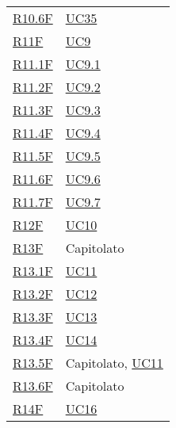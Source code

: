 \begin{center}
\begin{longtable}[!h]{p{50px} p{50px}}
        \hyperref[tab:RequisitiFunzionali]{R10.6F} & \hyperref[sec:UC35]{UC35}                      \\
        \hyperref[tab:RequisitiFunzionali]{R11F}   & \hyperref[sec:UC9]{UC9}                        \\
        \hyperref[tab:RequisitiFunzionali]{R11.1F} & \hyperref[sec:UC9.1]{UC9.1}                    \\
        \hyperref[tab:RequisitiFunzionali]{R11.2F} & \hyperref[sec:UC9.2]{UC9.2}                    \\
        \hyperref[tab:RequisitiFunzionali]{R11.3F} & \hyperref[sec:UC9.3]{UC9.3}                    \\
        \hyperref[tab:RequisitiFunzionali]{R11.4F} & \hyperref[sec:UC9.4]{UC9.4}                    \\
        \hyperref[tab:RequisitiFunzionali]{R11.5F} & \hyperref[sec:UC9.5]{UC9.5}                    \\
        \hyperref[tab:RequisitiFunzionali]{R11.6F} & \hyperref[sec:UC9.6]{UC9.6}                    \\
        \hyperref[tab:RequisitiFunzionali]{R11.7F} & \hyperref[sec:UC9.7]{UC9.7}                    \\
        \hyperref[tab:RequisitiFunzionali]{R12F}   & \hyperref[sec:UC10]{UC10}                      \\
        \hyperref[tab:RequisitiFunzionali]{R13F}   & Capitolato                                     \\
        \hyperref[tab:RequisitiFunzionali]{R13.1F} & \hyperref[sec:UC11]{UC11}                      \\
        \hyperref[tab:RequisitiFunzionali]{R13.2F} & \hyperref[sec:UC12]{UC12}                      \\
        \hyperref[tab:RequisitiFunzionali]{R13.3F} & \hyperref[sec:UC13]{UC13}                      \\
        \hyperref[tab:RequisitiFunzionali]{R13.4F} & \hyperref[sec:UC14]{UC14}                      \\
        \hyperref[tab:RequisitiFunzionali]{R13.5F} & Capitolato, \newline \hyperref[sec:UC11]{UC11} \\
        \hyperref[tab:RequisitiFunzionali]{R13.6F} & Capitolato                                     \\
        \hyperref[tab:RequisitiFunzionali]{R14F}   & \hyperref[sec:UC16]{UC16}                      \\

\end{longtable}
\end{center}
